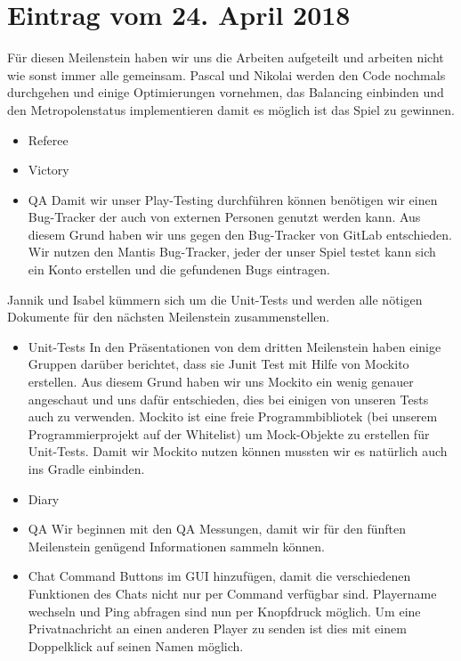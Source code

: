 \documentclass{scrartcl}
\newcommand{\n}{\newline}
\begin{document}
\section*{Eintrag vom 24. April 2018}
Für diesen Meilenstein haben wir uns die Arbeiten aufgeteilt und arbeiten nicht wie sonst immer alle gemeinsam. Pascal und Nikolai werden den Code nochmals durchgehen und einige Optimierungen vornehmen, das Balancing einbinden und den Metropolenstatus implementieren damit es möglich ist das Spiel zu gewinnen. 
\begin{itemize}
	\item Referee
	\item Victory
	\item QA \n
	Damit wir unser Play-Testing durchführen können benötigen wir einen Bug-Tracker der auch von externen Personen genutzt werden kann. Aus diesem Grund haben wir uns gegen den Bug-Tracker von GitLab entschieden. Wir nutzen den Mantis Bug-Tracker, jeder der unser Spiel testet kann sich ein Konto erstellen und die gefundenen Bugs eintragen.
\end{itemize}

Jannik und Isabel kümmern sich um die Unit-Tests und werden alle nötigen Dokumente für den nächsten Meilenstein zusammenstellen.
\begin{itemize}
	\item Unit-Tests \n
	In den Präsentationen von dem dritten Meilenstein haben einige Gruppen darüber berichtet, dass sie Junit Test mit Hilfe von Mockito erstellen. Aus diesem Grund haben wir uns Mockito ein wenig genauer angeschaut und uns dafür entschieden, dies bei einigen von unseren Tests auch zu verwenden. Mockito ist eine freie Programmbibliotek (bei unserem Programmierprojekt auf der Whitelist) um Mock-Objekte zu erstellen für Unit-Tests. Damit wir Mockito nutzen können mussten wir es natürlich auch ins Gradle einbinden. 
	\item Diary
	\item QA \n
	Wir beginnen mit den QA Messungen, damit wir für den fünften Meilenstein genügend Informationen sammeln können.
	\item Chat Command \n
	Buttons im GUI hinzufügen, damit die verschiedenen Funktionen des Chats nicht nur per Command verfügbar sind. Playername wechseln und Ping abfragen sind nun per Knopfdruck möglich. Um eine Privatnachricht an einen anderen Player zu senden ist dies mit einem Doppelklick auf seinen Namen möglich.
\end{itemize}
	
	
\end{document}
